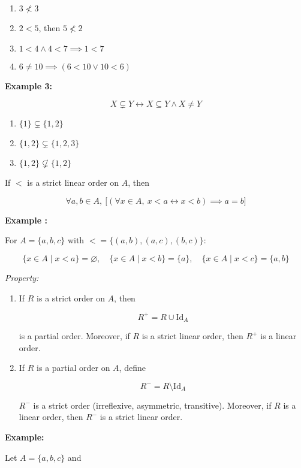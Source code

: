 \documentclass[12pt,a4paper,openany]{article}
\begin{document}
\begin{enumerate}
\item $3 \not< 3$
\item $2 < 5$, then $5 \not< 2$
\item $1 < 4 \land 4 < 7 \implies 1 < 7$
\item $6 \neq 10 \implies (6 < 10 \lor 10 < 6)$
\end{enumerate}

\textbf{Example 3:}

$$
X \subsetneq Y \leftrightarrow X \subseteq Y \land X \neq Y
$$

\begin{enumerate}
\item $\{1\} \subsetneq \{1, 2\}$
\item $\{1, 2\} \subsetneq \{1, 2, 3\}$
\item $\{1, 2\} \not\subsetneq \{1, 2\}$
\end{enumerate}

If $<$ is a strict linear order on $A$, then

$$
\forall a,b \in A, \ \big[ (\forall x \in A, \ x < a \leftrightarrow x < b) \implies a = b \big]
$$

\textbf{Example :}

For $A = \{a,b,c\}$ with $< = \{(a,b),(a,c),(b,c)\}$:

$$
\{ x \in A \mid x < a \} = \varnothing, \quad
\{ x \in A \mid x < b \} = \{a\}, \quad
\{ x \in A \mid x < c \} = \{a,b\}
$$

\textit{Property:}

\begin{enumerate}
\item If $R$ is a strict order on $A$, then

    $$
    R^+ = R \cup \text{Id}_A
    $$

    is a partial order. Moreover, if $R$ is a strict linear order, then $R^+$ is a linear order.

\item If $R$ is a partial order on $A$, define

    $$
    R^- = R \setminus \text{Id}_A
    $$

    $R^-$ is a strict order (irreflexive, asymmetric, transitive). Moreover, if $R$ is a linear order, then $R^-$ is a strict linear order.
\end{enumerate}

\textbf{Example:}

Let $A = \{a,b,c\}$ and
\end{document}
